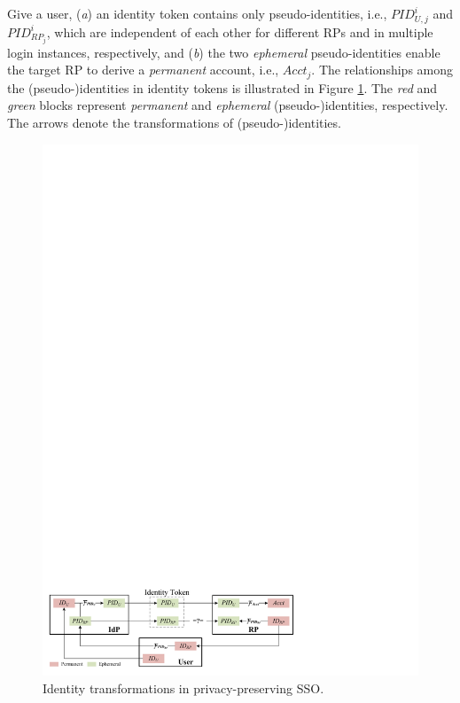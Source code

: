 Give a user,
    (\emph{a}) an identity token contains only pseudo-identities, i.e., $PID_{U,j}^i$ and $PID_{RP_j}^i$,
        which are independent of each other for different RPs and in multiple login instances, respectively,
    and (\emph{b}) the two \emph{ephemeral} pseudo-identities enable the target RP to derive a \emph{permanent} account, i.e., $Acct_j$.
The relationships among the (pseudo-)identities in identity tokens is illustrated in Figure \ref{fig:IDCorrelation}.
The \emph{red} and \emph{green} blocks represent \emph{permanent} and \emph{ephemeral} (pseudo-)identities, respectively.
The arrows denote the transformations of (pseudo-)identities.


\begin{figure}[bt]
  \centering
  \includegraphics[width=0.98\linewidth]{fig/IDCorrelation.pdf}
  \caption{Identity transformations in privacy-preserving SSO.}
  \label{fig:IDCorrelation}
\end{figure}

